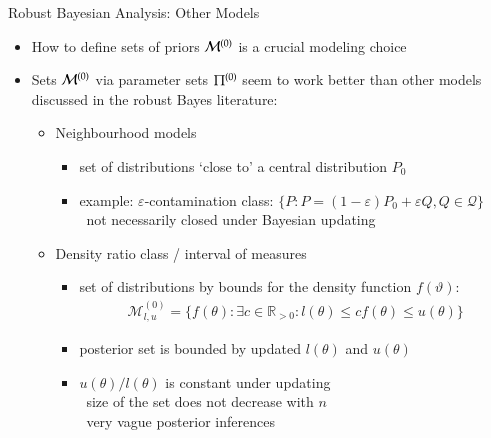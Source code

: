 \documentclass{beamer}
\newcommand{\reals}{\mathbb{R}}
\newcommand{\posreals}{\reals_{>0}}
\newcommand{\uz}{^{(0)}} %
\newcommand{\play}{\structure{$\blacktriangleright$}}
\begin{document}
\begin{frame}{Robust Bayesian Analysis: Other Models}
\begin{itemize}
\item How to define sets of priors $\MZ$ is a crucial modeling choice
\item Sets $\MZ$ via parameter sets $\PZ$ seem to work better than other models discussed in the robust Bayes literature:
\begin{itemize}
\item Neighbourhood models
\begin{itemize}
\item set of distributions `close to' a central distribution $P_0$
\item example: $\varepsilon$-contamination class:
$\{ P : P = (1-\varepsilon) P_0 + \varepsilon Q, Q \in \mathcal{Q} \}$\\
\quad\play\ not necessarily closed under Bayesian updating
\end{itemize}
\pause
\item Density ratio class / interval of measures 
\begin{itemize}
\item set of distributions by bounds for the density function $f(\vartheta)$:
\begin{align*}
\mathcal{M}\uz_{l,u} = \big\{ f(\theta) :
\exists c \in \posreals: l(\theta) \le c f(\theta) \le u(\theta)\big\}
\end{align*}
\item posterior set is bounded by updated $l(\theta)$ and $u(\theta)$
\item $u(\theta)/l(\theta)$ is constant under updating\\
\quad\play\ size of the set does not decrease with $n$\\
\quad\play\ very vague posterior inferences
\end{itemize}
\end{itemize}
\end{itemize}
\end{frame}
\end{document}
